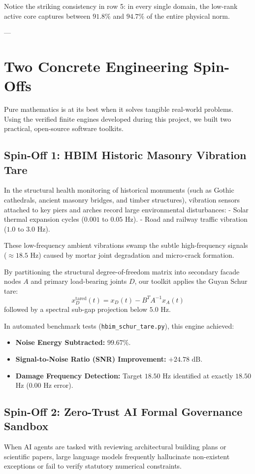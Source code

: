 \documentclass[11pt,a4paper]{article}
\begin{document}
Notice the striking consistency in row 5: in every single domain, the low-rank active core captures between $91.8\%$ and $94.7\%$ of the entire physical norm.

---

\section{Two Concrete Engineering Spin-Offs}

Pure mathematics is at its best when it solves tangible real-world problems. Using the verified finite engines developed during this project, we built two practical, open-source software toolkits.

\subsection{Spin-Off 1: HBIM Historic Masonry Vibration Tare}
In the structural health monitoring of historical monuments (such as Gothic cathedrals, ancient masonry bridges, and timber structures), vibration sensors attached to key piers and arches record large environmental disturbances:
- Solar thermal expansion cycles ($0.001$ to $0.05$ Hz).
- Road and railway traffic vibration ($1.0$ to $3.0$ Hz).

These low-frequency ambient vibrations swamp the subtle high-frequency signals ($\approx 18.5$ Hz) caused by mortar joint degradation and micro-crack formation.

By partitioning the structural degree-of-freedom matrix into secondary facade nodes $A$ and primary load-bearing joints $D$, our toolkit applies the Guyan Schur tare:
$$x_D^{\mathrm{tared}}(t) = x_D(t) - B^T A^{-1} x_A(t)$$
followed by a spectral sub-gap projection below $5.0$ Hz. 

In automated benchmark tests (\texttt{hbim\_schur\_tare.py}), this engine achieved:
\begin{itemize}
    \item \textbf{Noise Energy Subtracted:} $99.67\%$.
    \item \textbf{Signal-to-Noise Ratio (SNR) Improvement:} $+24.78 \text{ dB}$.
    \item \textbf{Damage Frequency Detection:} Target $18.50$ Hz identified at exactly $18.50$ Hz ($0.00$ Hz error).
\end{itemize}

\subsection{Spin-Off 2: Zero-Trust AI Formal Governance Sandbox}
When AI agents are tasked with reviewing architectural building plans or scientific papers, large language models frequently hallucinate non-existent exceptions or fail to verify statutory numerical constraints.
\end{document}
